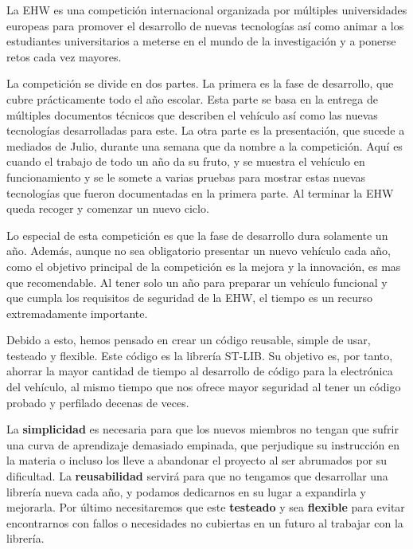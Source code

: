 \documentclass{report}
\begin{document}
La EHW es una competición internacional organizada por múltiples universidades europeas para promover el desarrollo de nuevas tecnologías así como animar a los estudiantes universitarios a meterse en el mundo de la investigación y a ponerse retos cada vez mayores. \par
La competición se divide en dos partes. La primera es la fase de desarrollo, que cubre prácticamente todo el año escolar. Esta parte se basa en la entrega de múltiples documentos técnicos que describen el vehículo así como las nuevas tecnologías desarrolladas para este. La otra parte es la presentación, que sucede a mediados de Julio, durante una semana que da nombre a la competición. Aquí es cuando el trabajo de todo un año da su fruto, y se muestra el vehículo en funcionamiento y se le somete a varias pruebas para mostrar estas nuevas tecnologías que fueron documentadas en la primera parte. Al terminar la EHW queda recoger y comenzar un nuevo ciclo. \par \vspace{0.3 cm}
Lo especial de esta competición es que la fase de desarrollo dura solamente un año. Además, aunque no sea obligatorio presentar un nuevo vehículo cada año, como el objetivo principal de la competición es la mejora y la innovación, es mas que recomendable. Al tener solo un año para preparar un vehículo funcional y que cumpla los requisitos de seguridad de la EHW, el tiempo es un recurso extremadamente importante. \par \vspace{0.3 cm}
Debido a esto, hemos pensado en crear un código reusable, simple de usar, testeado y flexible. Este código es la librería ST-LIB. Su objetivo es, por tanto, ahorrar la mayor cantidad de tiempo al desarrollo de código para la electrónica del vehículo, al mismo tiempo que nos ofrece mayor seguridad al tener un código probado y perfilado decenas de veces. \par
La {\bfseries simplicidad} es necesaria para que los nuevos miembros no tengan que sufrir una curva de aprendizaje demasiado empinada, que perjudique su instrucción en la materia o incluso los lleve a abandonar el proyecto al ser abrumados por su dificultad. La {\bfseries reusabilidad} servirá para que no tengamos que desarrollar una librería nueva cada año, y podamos dedicarnos en su lugar a expandirla y mejorarla. Por último necesitaremos que este {\bfseries testeado} y sea {\bfseries flexible} para evitar encontrarnos con fallos o necesidades no cubiertas en un futuro al trabajar con la librería. 
\end{document}

